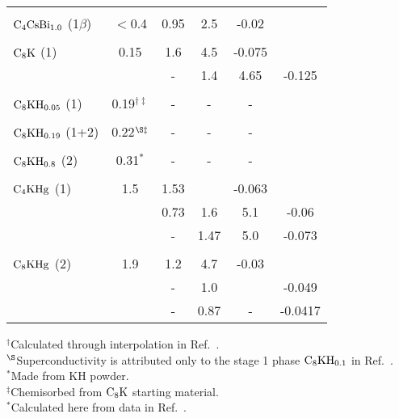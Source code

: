 \begin{table}
\begin{center}
\begin{tabular}{|lc|cccc|}
& & & & \\
$\rm C_4CsBi_{1.0}$ (1$\beta$) & $<$0.4\cite{E291} & 0.95\cite{yang88} & 2.5\cite{yang88} & -0.02\cite{yang88}\\
& & & & \\
$\rm C_8K$ (1) & 0.15\cite{kaneiwa82} & 1.6\cite{doll87} & 4.5\cite{doll87} & -0.075\cite{tanuma78}\\
& &-& 1.4\cite{tanuma78} & 4.65\cite{fischer85} & -0.125\cite{preil84}\\
& & & & \\
$\rm C_8KH_{0.05}$ (1) & 0.19$^{\dagger\ddag}$\cite{enoki85} & - & - & -\\
& & & & \\
$\rm C_8KH_{0.19}$ (1+2) & 0.22$^{\S\ddag}$\cite{kaneiwa82} & - & - & -\\
& & & & \\
$\rm C_8KH_{0.8}$ (2) & 0.31$^{\ast}$\cite{suzuki85b} & - & - & -\\
& & & & \\
$\rm C_4KHg$ (1) & 1.5\cite{W179} & 1.53\cite{W179} &  & -0.063\cite{W179}\\
& & 0.73\cite{tanuma81} & 1.6\cite{yang88} & 5.1\cite{yang88} & -0.06\cite{yang88}\\
& &-& 1.47\cite{preil84} & 5.0\cite{fischer85} & -0.073\cite{conard81}\\
& & & & \\
$\rm C_8KHg$ (2) & 1.9\cite{pendrys81} & 1.2 & 4.7\cite{yang88} & -0.03\cite{yang88} \\
& &-& 1.0\cite{W179}  &  & -0.049\cite{W179} \\
& &-& 0.87\cite{preil84} &-& -0.0417\cite{preil84}\\
\hline
\end{tabular}
\end{center}
$^{\dagger}$Calculated through interpolation in Ref.~\cite{enoki85}.\\
$^{\S}$Superconductivity is attributed only to the stage 1  phase $\rm
C_8KH_{0.1}$ in Ref.~\cite{enoki85}.\\
$^{\ast}$Made from KH powder.\\
$^{\ddag}$Chemisorbed from $\rm C_8K$ starting material.\\
$^*$Calculated here from data in Ref.~\cite{E291}.
\end{table}


